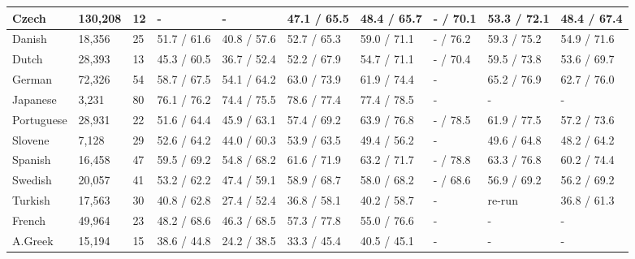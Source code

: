 \begin{table}
\begin{tabular}{|l|l|l|l|l|l|l|l|l|l|}
        Czech      & 130,208 & 12   & -             & -            & 47.1 / 65.5   & 48.4 / 65.7    & - / 70.1    & 53.3 / 72.1     & 48.4 / 67.4 \\ \hline
        Danish     & 18,356  & 25   & 51.7 / 61.6   & 40.8 / 57.6   & 52.7 / 65.3   & 59.0 / 71.1   & - / 76.2    & 59.3 / 75.2     & 54.9 / 71.6 \\ \hline
        Dutch      & 28,393  & 13   & 45.3 / 60.5   & 36.7 / 52.4   & 52.2 / 67.9   & 54.7 / 71.1   & - / 70.4    & 59.5 / 73.8     & 53.6 / 69.7 \\ \hline
        German     & 72,326  & 54   & 58.7 / 67.5   & 54.1 / 64.2   & 63.0 / 73.9   & 61.9 / 74.4   & -           & 65.2 / 76.9     & 62.7 / 76.0 \\ \hline
        Japanese   & 3,231   & 80   & 76.1 / 76.2   & 74.4 / 75.5   & 78.6 / 77.4   & 77.4 / 78.5   & -           & -               & -           \\ \hline
        Portuguese & 28,931  & 22   & 51.6 / 64.4   & 45.9 / 63.1   & 57.4 / 69.2   & 63.9 / 76.8   & - / 78.5    & 61.9 / 77.5     & 57.2 / 73.6 \\ \hline
        Slovene    & 7,128   & 29   & 52.6 / 64.2   & 44.0 / 60.3   & 53.9 / 63.5   & 49.4 / 56.2   & -           & 49.6 / 64.8     & 48.2 / 64.2 \\ \hline
        Spanish    & 16,458  & 47   & 59.5 / 69.2   & 54.8 / 68.2   & 61.6 / 71.9   & 63.2 / 71.7   & - / 78.8    & 63.3 / 76.8     & 60.2 / 74.4 \\ \hline
        Swedish    & 20,057  & 41   & 53.2 / 62.2   & 47.4 / 59.1   & 58.9 / 68.7   & 58.0 / 68.2   & - / 68.6     & 56.9 / 69.2      & 56.2 / 69.2  \\ \hline
        Turkish    & 17,563  & 30   & 40.8 / 62.8   & 27.4 / 52.4   & 36.8 / 58.1   & 40.2 / 58.7   & -           & re-run          & 36.8 / 61.3  \\ \hline
        French     & 49,964  & 23   & 48.2 / 68.6   & 46.3 / 68.5   & 57.3 / 77.8   & 55.0 / 76.6   & -           & -               & -        \\ \hline
        A.Greek    & 15,194  & 15   & 38.6 / 44.8   & 24.2 / 38.5   & 33.3 / 45.4  & 40.5 / 45.1    & -           & -               & -        \\ \hline
        \hline
    \end{tabular}
\end{table}
